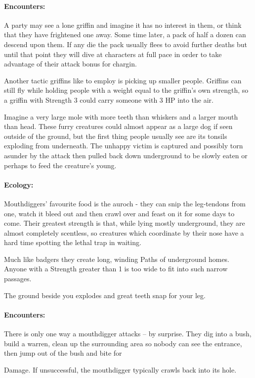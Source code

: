\begin{multicols}{2}
\paragraph{Encounters:} A party may see a lone griffin and imagine it has no interest in them, or think that they have frightened one away.  Some time later, a pack of half a dozen can descend upon them.  If any die the pack usually flees to avoid further deaths but until that point they will dive at characters at full pace in order to take advantage of their attack bonus for chargin.

Another tactic griffins like to employ is picking up smaller people.  Griffins can still fly while holding people with a weight equal to the griffin's own strength, so a griffin with Strength 3 could carry someone with 3 HP into the air.

\label{mouthdigger}

Imagine a very large mole with more teeth than whiskers and a larger mouth than head.  These furry creatures could almost appear as a large dog if seen outside of the ground, but the first thing people usually see are its tonsils exploding from underneath.  The unhappy victim is captured and possibly torn asunder by the attack then pulled back down underground to be slowly eaten or perhaps to feed the creature's young.

\paragraph{Ecology:} Mouthdiggers' favourite food is the auroch - they can snip the leg-tendons from one, watch it bleed out and then crawl over and feast on it for some days to come.  Their greatest strength is that, while lying mostly underground, they are almost completely scentless, so creatures which coordinate by their nose have a hard time spotting the lethal trap in waiting.

Much like badgers they create long, winding Paths of underground homes.  Anyone with a Strength greater than 1 is too wide to fit into such narrow passages.

\begin{boxtext}

	The ground beside you explodes and great teeth snap for your leg.

\end{boxtext}

\paragraph{Encounters:} There is only one way a mouthdigger attacks -- by surprise.  They dig into a bush, build a warren, clean up the surrounding area so nobody can see the entrance, then jump out of the bush and bite for \addtocounter{strb}{-5} Damage.  If unsuccessful, the mouthdigger typically crawls back into its hole.


\end{multicols}
